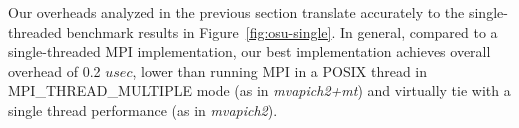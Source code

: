 Our overheads analyzed in the previous section translate accurately to the
single-threaded benchmark results in Figure~\ref{fig:osu-single}. In general,
compared to a single-threaded MPI implementation, our best implementation
achieves overall overhead of 0.2 $usec$, lower than running MPI
in a POSIX thread in MPI_THREAD_MULTIPLE mode (as in \textit{mvapich2+mt}) and virtually
tie with a single thread performance (as in \textit{mvapich2}).
